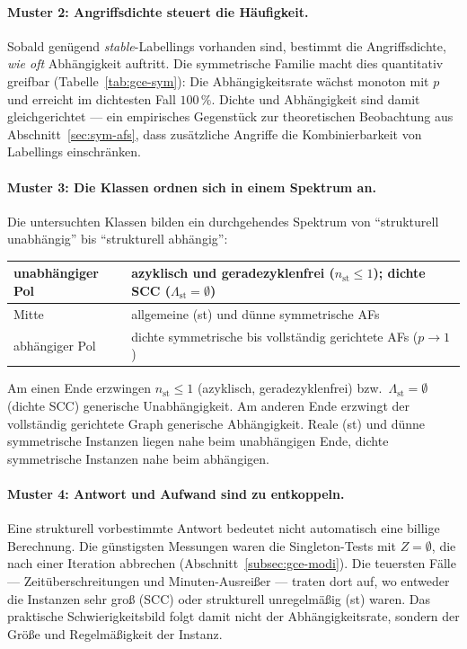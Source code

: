 \paragraph{Muster 2: Angriffsdichte steuert die H\"aufigkeit.}
Sobald gen\"ugend \textit{stable}-Labellings vorhanden sind, bestimmt die
Angriffsdichte, \emph{wie oft} Abh\"angigkeit auftritt. Die symmetrische
Familie macht dies quantitativ greifbar (Tabelle~\ref{tab:gce-sym}): Die
Abh\"angigkeitsrate w\"achst monoton mit \(p\) und erreicht im dichtesten Fall
\(100\,\%\). Dichte und Abh\"angigkeit sind damit gleichgerichtet --- ein
empirisches Gegenst\"uck zur theoretischen Beobachtung aus
Abschnitt~\ref{sec:sym-afs}, dass zus\"atzliche Angriffe die Kombinierbarkeit
von Labellings einschr\"anken.

\paragraph{Muster 3: Die Klassen ordnen sich in einem Spektrum an.}
Die untersuchten Klassen bilden ein durchgehendes Spektrum von
\enquote{strukturell unabh\"angig} bis \enquote{strukturell abh\"angig}:
\begin{center}
\begin{tabularx}{\textwidth}{lX} \toprule
    unabh\"angiger Pol & azyklisch und geradezyklenfrei
        (\(n_{\mathrm{st}}\leq1\)); dichte SCC
        (\(\Lambda_{\mathrm{st}}=\emptyset\)) \\ \midrule
    Mitte & allgemeine (st) und d\"unne symmetrische AFs \\ \midrule
    abh\"angiger Pol & dichte symmetrische bis vollst\"andig gerichtete AFs
        (\(p\to1\)) \\ \bottomrule
\end{tabularx}
\end{center}
Am einen Ende erzwingen \(n_{\mathrm{st}}\leq 1\) (azyklisch, geradezyklenfrei)
bzw.\ \(\Lambda_{\mathrm{st}}=\emptyset\) (dichte SCC) generische
Unabh\"angigkeit. Am anderen Ende erzwingt der vollst\"andig gerichtete Graph
generische Abh\"angigkeit. Reale (st) und d\"unne symmetrische Instanzen liegen
nahe beim unabh\"angigen Ende, dichte symmetrische Instanzen nahe beim
abh\"angigen.

\paragraph{Muster 4: Antwort und Aufwand sind zu entkoppeln.}
Eine strukturell vorbestimmte Antwort bedeutet nicht automatisch eine billige
Berechnung. Die g\"unstigsten Messungen waren die Singleton-Tests mit
\(Z=\emptyset\), die nach einer Iteration abbrechen
(Abschnitt~\ref{subsec:gce-modi}). Die teuersten F\"alle --- Zeit\"uberschreitungen
und Minuten-Ausrei\ss er --- traten dort auf, wo entweder die Instanzen sehr
gro\ss{} (SCC) oder strukturell unregelm\"a\ss ig (st) waren. Das praktische
Schwierigkeitsbild folgt damit nicht der Abh\"angigkeitsrate, sondern der
Gr\"o\ss e und Regelm\"a\ss igkeit der Instanz.

